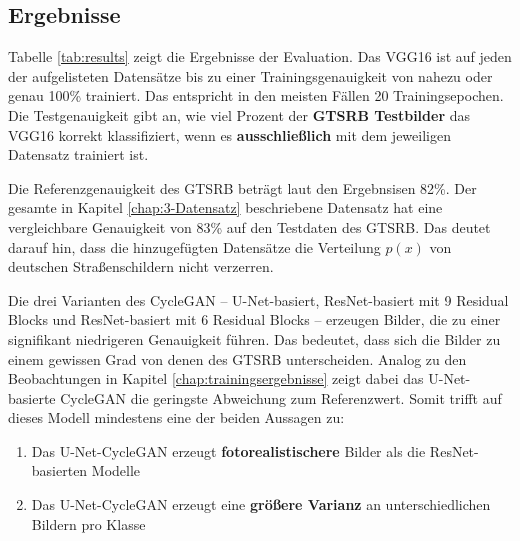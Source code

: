 
\subsection{Ergebnisse}

Tabelle \ref{tab:results} zeigt die Ergebnisse der Evaluation. Das VGG16 ist auf jeden der aufgelisteten Datensätze bis zu einer Trainingsgenauigkeit von nahezu oder genau 100\% trainiert. Das entspricht in den meisten Fällen 20 Trainingsepochen. Die Testgenauigkeit gibt an, wie viel Prozent der \textbf{\ac{GTSRB} Testbilder} das VGG16 korrekt klassifiziert, wenn es \textbf{ausschließlich} mit dem jeweiligen Datensatz trainiert ist.

Die Referenzgenauigkeit des \ac{GTSRB} beträgt laut den Ergebnsisen 82\%. Der gesamte in Kapitel \ref{chap:3-Datensatz} beschriebene Datensatz hat eine vergleichbare Genauigkeit von 83\% auf den Testdaten des \ac{GTSRB}. Das deutet darauf hin, dass die hinzugefügten Datensätze die Verteilung $p(x)$ von deutschen Straßenschildern nicht verzerren.

Die drei Varianten des \ac{CycleGAN} -- U-Net-basiert, ResNet-basiert mit 9 Residual Blocks und ResNet-basiert mit 6 Residual Blocks -- erzeugen Bilder, die zu einer signifikant niedrigeren Genauigkeit führen. Das bedeutet, dass sich die Bilder zu einem gewissen Grad von denen des \ac{GTSRB} unterscheiden. Analog zu den Beobachtungen in Kapitel \ref{chap:trainingsergebnisse} zeigt dabei das U-Net-basierte \ac{CycleGAN} die geringste Abweichung zum Referenzwert. Somit trifft auf dieses Modell mindestens eine der beiden Aussagen zu:
\begin{enumerate}
	\item Das U-Net-\ac{CycleGAN} erzeugt \textbf{fotorealistischere} Bilder als die ResNet-basierten Modelle
	\item Das U-Net-\ac{CycleGAN} erzeugt eine \textbf{größere Varianz} an unterschiedlichen Bildern pro Klasse
\end{enumerate}

